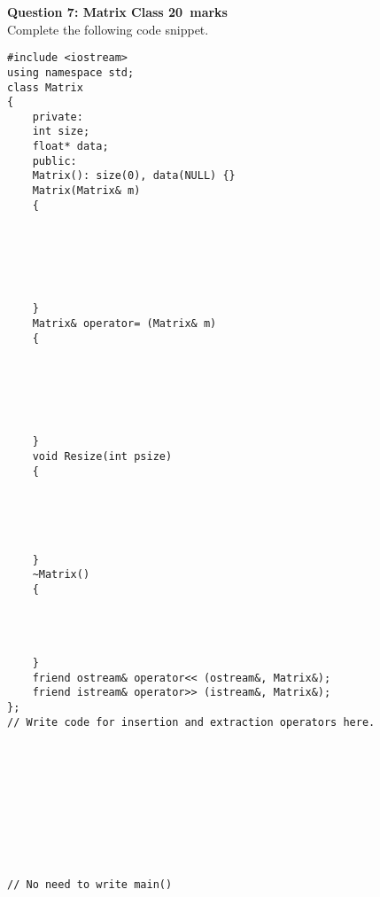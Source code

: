 \documentclass[12pt,a4paper]{article}
\def\Qseven{20}
\begin{document}
\newpage
\noindent\textbf{Question 7: Matrix Class \hfill \Qseven~marks}\\
Complete the following code snippet.
\begin{lstlisting}
#include <iostream>
using namespace std;
class Matrix
{
	private:
	int size;
	float* data;
	public:
	Matrix(): size(0), data(NULL) {}
	Matrix(Matrix& m)
	{
	
	
	
	
	
	
	}
	Matrix& operator= (Matrix& m)
	{
	
	
	
	
	
		
	}
	void Resize(int psize)
	{
	
		
	
	
	
	}
	~Matrix()
	{
	
	
	
	
	}
	friend ostream& operator<< (ostream&, Matrix&);
	friend istream& operator>> (istream&, Matrix&);
};
// Write code for insertion and extraction operators here.










// No need to write main()
\end{lstlisting}


\end{document}
